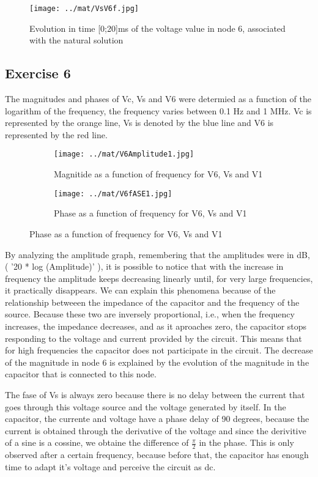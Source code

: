 \begin{figure}[h] 
    \centering
    \texttt{[image: ../mat/VsV6f.jpg]}
    \caption{Evolution in time [0;20]ms of the voltage value in node 6, associated with the natural solution}
    \label{fig:v6n}
\end{figure}

\newpage
\subsection{Exercise 6}
\label{sec:6}
The magnitudes and phases of Vc, Vs and V6 were determied as a function of the logarithm of the frequency, the frequency varies between 0.1 Hz and 1 MHz.
Vc is represented by the orange line, Vs is denoted by the blue line and V6 is represented by the red line.

\begin{figure}[ht]
\centering
\begin{subfigure}{.5\textwidth}
  \centering
  \texttt{[image: ../mat/V6Amplitude1.jpg]}
  \caption{Magnitide as a function of frequency for V6, Vs and V1}
  \label{fig:sub1}
\end{subfigure}%
\begin{subfigure}{.5\textwidth}
  \centering
  \texttt{[image: ../mat/V6fASE1.jpg]}
  \caption{Phase as a function of frequency for V6, Vs and V1}
  \label{fig:sub2}
\end{subfigure}
\label{fig:test}
\end{figure}

By analyzing the amplitude graph, remembering that the amplitudes were in  dB, ( '20 * log (Amplitude)' ), it is possible to notice that with the increase 
in frequency the amplitude keeps decreasing linearly until, for very large frequencies, it practically disappears. We can explain this phenomena
because of the relationship betweeen the impedance of the capacitor and the frequency of the source. Because these two are inversely proportional, i.e.,
when the frequency increases, the impedance decreases, and as it aproaches zero, the capacitor stops responding to the voltage and current provided by the circuit.
This means that for high frequencies the capacitor does not participate in the circuit. 
The decrease of the magnitude in node 6 is explained by the evolution of the magnitude in the capacitor that is connected to this node.

The fase of Vs is always zero because there is no delay between the current that goes through this voltage source and the voltage generated by itself.
In the capacitor, the currente and voltage have a phase delay of 90 degrees, because the current is obtained through the derivative of the voltage and since the 
derivitive of a sine is a cossine, we obtaine the difference of $\frac{\pi}{2}$ in the phase. This is only observed after a certain frequency, because before that, 
the capacitor has enough time to adapt it's voltage and perceive the circuit as dc. 

\newpage
